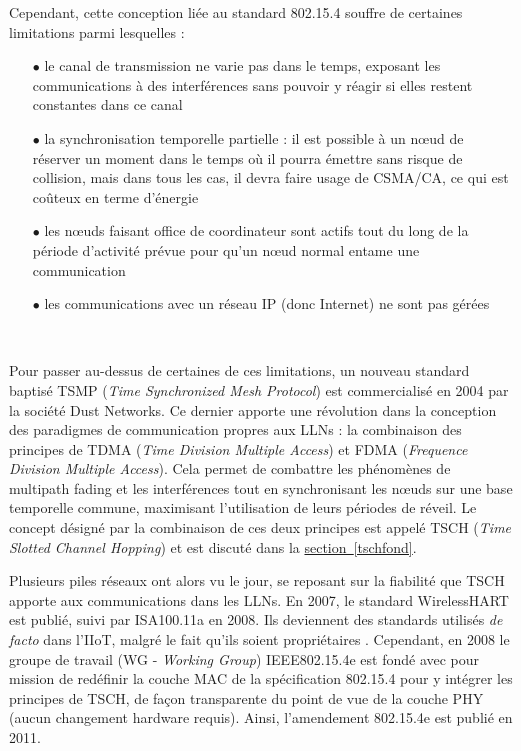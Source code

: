 \documentclass[]{report}
\newcommand{\wordlink}[2]{\hyperref[#2]{#1~\ref{#2}}}
\begin{document}
\par Cependant, cette conception liée au standard 802.15.4 souffre de certaines limitations parmi lesquelles :\\

\begin{itemize}
\item[$\bullet$] le canal de transmission ne varie pas dans le temps, exposant les communications à des interférences sans pouvoir y réagir si elles restent constantes dans ce canal
\vspace{0.2cm}
\item[$\bullet$] la synchronisation temporelle partielle : il est possible à un nœud de réserver un moment dans le temps où il pourra émettre sans risque de collision, mais dans tous les cas, il devra faire usage de CSMA/CA, ce qui est coûteux en terme d'énergie
\vspace{0.2cm}
\item[$\bullet$] les nœuds faisant office de coordinateur sont actifs tout du long de la période d'activité prévue pour qu'un nœud normal entame une communication
\vspace{0.2cm}
\item[$\bullet$] les communications avec un réseau IP (donc Internet) ne sont pas gérées
\end{itemize}
~\\
\par Pour passer au-dessus de certaines de ces limitations, un nouveau standard baptisé TSMP (\textit{Time Synchronized Mesh Protocol}) est commercialisé en 2004 par la société Dust Networks. Ce dernier apporte une révolution dans la conception des paradigmes de communication propres aux LLNs : la combinaison des principes de TDMA (\textit{Time Division Multiple Access}) et FDMA (\textit{Frequence Division Multiple Access}). Cela permet de combattre les phénomènes de multipath fading et les interférences tout en synchronisant les nœuds sur une base temporelle commune, maximisant l'utilisation de leurs périodes de réveil. Le concept désigné par la combinaison de ces deux principes est appelé TSCH (\textit{Time Slotted Channel Hopping}) et est discuté dans la \wordlink{section}{tschfond}.\\

\par Plusieurs piles réseaux ont alors vu le jour, se reposant sur la fiabilité que TSCH apporte aux communications dans les LLNs. En 2007, le standard WirelessHART est publié, suivi par ISA100.11a en 2008. Ils deviennent des standards utilisés \textit{de facto} dans l'IIoT, malgré le fait qu'ils soient propriétaires \cite{link-layer-sec-impact}. Cependant, en 2008 le groupe de travail (WG - \textit{Working Group}) IEEE802.15.4e est fondé avec pour mission de redéfinir la couche MAC de la spécification 802.15.4 pour y intégrer les principes de TSCH, de façon transparente du point de vue de la couche PHY (aucun changement hardware requis). Ainsi, l'amendement 802.15.4e est publié en 2011.\\
\end{document}

